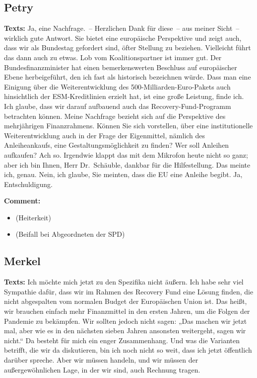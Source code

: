 \documentclass{article}
\begin{document}
\subsection{Petry}
\noindent\textbf{Texts:} Ja, eine Nachfrage. – Herzlichen Dank für diese – aus meiner Sicht – wirklich gute Antwort. Sie bietet eine europäische Perspektive und zeigt auch, dass wir als Bundestag gefordert sind, öfter Stellung zu beziehen. Vielleicht führt das dann auch zu etwas. Lob vom Koalitionspartner ist immer gut. Der Bundesfinanzminister hat einen bemerkenswerten Beschluss auf europäischer Ebene herbeigeführt, den ich fast als historisch bezeichnen würde. Dass man eine Einigung über die Weiterentwicklung des 500-Milliarden-Euro-Pakets auch hinsichtlich der ESM-Kreditlinien erzielt hat, ist eine große Leistung, finde ich.  Ich glaube, dass wir darauf aufbauend auch das Recovery-Fund-Programm betrachten können. Meine Nachfrage bezieht sich auf die Perspektive des mehrjährigen Finanzrahmens. Können Sie sich vorstellen, über eine institutionelle Weiterentwicklung auch in der Frage der Eigenmittel, nämlich des Anleiheankaufs, eine Gestaltungsmöglichkeit zu finden? Wer soll Anleihen aufkaufen? Ach so.  Irgendwie klappt das mit dem Mikrofon heute nicht so ganz; aber ich bin Ihnen, Herr Dr. Schäuble, dankbar für die Hilfestellung. Das meinte ich, genau. Nein, ich glaube, Sie meinten, dass die EU eine Anleihe begibt. Ja, Entschuldigung.

\noindent\textbf{Comment:}
\begin{itemize}
    \setlength\itemsep{-3pt}
    \item (Heiterkeit)
    \setlength\itemsep{-3pt}
    \item (Beifall bei Abgeordneten der SPD)
\end{itemize}
\subsection{Merkel}
\noindent\textbf{Texts:} Ich möchte mich jetzt zu den Spezifika nicht äußern. Ich habe sehr viel Sympathie dafür, dass wir im Rahmen des Recovery Fund eine Lösung finden, die nicht abgespalten vom normalen Budget der Europäischen Union ist. Das heißt, wir brauchen einfach mehr Finanzmittel in den ersten Jahren, um die Folgen der Pandemie zu bekämpfen. Wir sollten jedoch nicht sagen: „Das machen wir jetzt mal, aber wie es in den nächsten sieben Jahren ansonsten weitergeht, sagen wir nicht.“ Da besteht für mich ein enger Zusammenhang. Und was die Varianten betrifft, die wir da diskutieren, bin ich noch nicht so weit, dass ich jetzt öffentlich darüber spreche. Aber wir müssen handeln, und wir müssen der außergewöhnlichen Lage, in der wir sind, auch Rechnung tragen.
\end{document}
